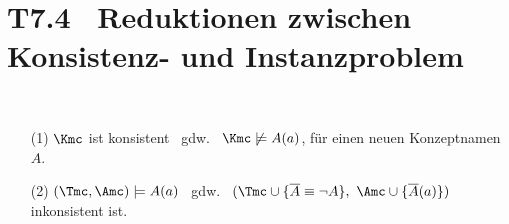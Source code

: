 \documentclass[fontsize=11pt, twoside=false, numbers=autoenddot]{scrbook}
\begin{document}
\enlargethispage{10mm}
\section*{T7.4~ Reduktionen zwischen Konsistenz- und Instanzproblem}

~
%
\begin{enumerate}
  \item[(1)]
    $\Kmc$ ist konsistent ~gdw.~ $\Kmc \not\models A(a)$, für einen neuen Konzeptnamen $A$.
  \item[(2)]
    $(\Tmc,\Amc) \models A(a)$ ~gdw.~ $(\Tmc \cup \{ \overline{A} \equiv \neg A \},~\Amc \cup \{ \overline{A}(a) \})$ inkonsistent ist.
\end{enumerate}
\end{document}

